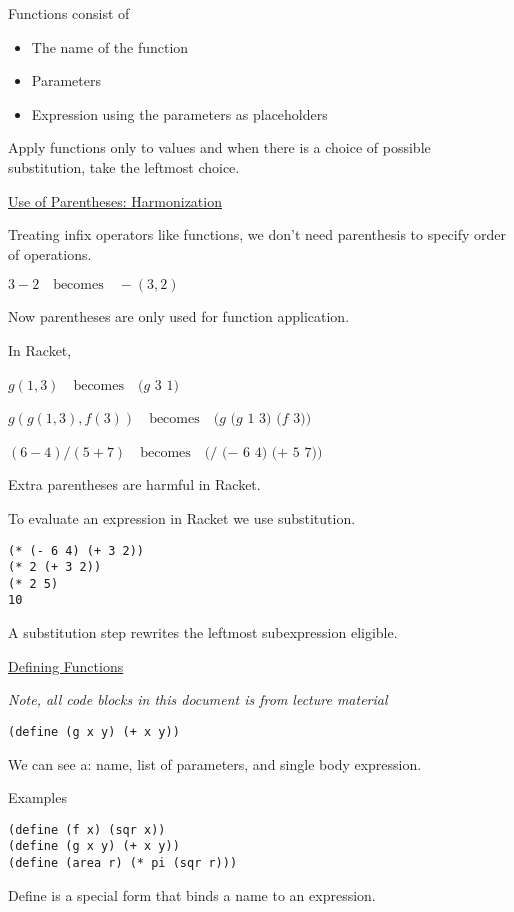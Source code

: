 \documentclass{article}
\begin{document}
Functions consist of
\begin{itemize}
    \item The name of the function
    \item Parameters
    \item Expression using the parameters as placeholders
\end{itemize}

Apply functions only to values and when there is a choice of possible substitution, take the leftmost choice. 


\underline{Use of Parentheses: Harmonization}

Treating infix operators like functions, we don't need parenthesis to specify order of operations. 

$3 - 2 \quad \text{becomes} \quad -(3,2)$

Now parentheses are only used for function application. 

In Racket, 

$g(1,3) \quad \text{becomes} \quad (g$ $3$ $1)$

$g(g(1,3),f(3)) \quad \text{becomes} \quad (g$ $(g$ $1$ $3)$ $(f$ $3))$

$(6 - 4)/(5+7) \quad \text{becomes} \quad (/$ $(-$ $6$ $4)$ $(+$ $5$ $7))$

Extra parentheses are harmful in Racket. 

To evaluate an expression in Racket we use substitution. 

\begin{lstlisting} 
(* (- 6 4) (+ 3 2))
(* 2 (+ 3 2))
(* 2 5) 
10
\end{lstlisting} 

A substitution step rewrites the leftmost subexpression eligible.


\underline{Defining Functions}

\textit{Note, all code blocks in this document is from lecture material}

\begin{lstlisting}
(define (g x y) (+ x y))
\end{lstlisting} 
We can see a: name, list of parameters, and single body expression. 

Examples
\begin{lstlisting} 
(define (f x) (sqr x))
(define (g x y) (+ x y))
(define (area r) (* pi (sqr r)))
\end{lstlisting} 

Define is a special form that binds a name to an expression. 
\end{document}
